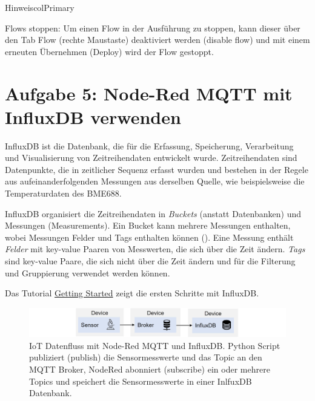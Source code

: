 \documentclass[
  11pt,
  a4paperpaper,
  oneside, openany  ,captions=tableheading
]{scrbook}
\theoremstyle{definition}
\theoremstyle{remark}
\begin{document}
\begin{boxtitle}{Hinweis}{colPrimary}

Flows stoppen: Um einen Flow in der Ausführung zu stoppen, kann dieser
über den Tab Flow (rechte Maustaste) deaktiviert werden (disable flow)
und mit einem erneuten Übernehmen (Deploy) wird der Flow gestoppt.

\end{boxtitle}

\section{Aufgabe 5: Node-Red MQTT mit InfluxDB
verwenden}\label{aufgabe-5-node-red-mqtt-mit-influxdb-verwenden}

InfluxDB ist die Datenbank, die für die Erfassung, Speicherung,
Verarbeitung und Visualisierung von Zeitreihendaten entwickelt wurde.
Zeitreihendaten sind Datenpunkte, die in zeitlicher Sequenz erfasst
wurden und bestehen in der Regele aus aufeinanderfolgenden Messungen aus
derselben Quelle, wie beispielsweise die Temperaturdaten des BME688.

InfluxDB organisiert die Zeitreihendaten in \emph{Buckets} (anstatt
Datenbanken) und Messungen (Measurements). Ein Bucket kann mehrere
Messungen enthalten, wobei Messungen Felder und Tags enthalten können
(). Eine Messung enthält
\emph{Felder} mit key-value Paaren von Messwerten, die sich über die
Zeit ändern. \emph{Tags} sind key-value Paare, die sich nicht über die
Zeit ändern und für die Filterung und Gruppierung verwendet werden
können.

Das Tutorial
\href{https://docs.influxdata.com/influxdb/v2/get-started/}{Getting
Started} zeigt die ersten Schritte mit InfluxDB.

\begin{figure}[H]

{\centering \includegraphics{images/mqtt-sensor-broker-influxdb.jpg}

}

\caption{IoT Datenfluss mit Node-Red MQTT und InfluxDB. Python Script
publiziert (publish) die Sensormesswerte und das Topic an den MQTT
Broker, NodeRed abonniert (subscribe) ein oder mehrere Topics und
speichert die Sensormesswerte in einer InlfuxDB Datenbank.}

\end{figure}%
\end{document}
